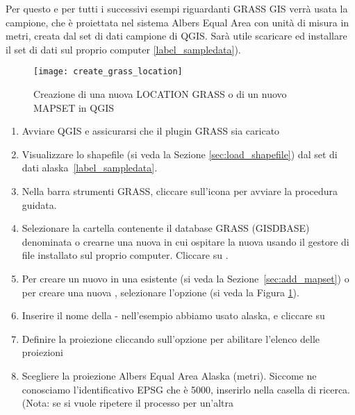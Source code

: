 Per questo e per tutti i successivi esempi riguardanti GRASS GIS verrà usata la  campione, che è proiettata nel sistema Albers Equal Area con unità di
misura in metri, creata dal set di dati campione di QGIS. Sarà utile scaricare
ed installare il set di dati sul proprio computer \ref{label_sampledata}).

\begin{figure}[ht]
\begin{center}
\caption{Creazione di una nuova LOCATION GRASS o di un nuovo MAPSET in QGIS \nixcaption}
\label{fig:create_grass_location}\smallskip
\texttt{[image: create\_grass\_location]}
\end{center}  
\end{figure}

\begin{enumerate}
  \item Avviare QGIS e assicurarsi che il plugin GRASS sia caricato
  \item Visualizzare lo shapefile  (si veda la Sezione
  \ref{sec:load_shapefile}) dal set di dati alaska~\ref{label_sampledata}.
  \item Nella barra strumenti GRASS, cliccare sull'icona
   per avviare la procedura guidata.
  \item Selezionare la cartella contenente il database GRASS (GISDBASE)
  denominata  o crearne una nuova in cui ospitare la nuova
   usando il gestore di file installato sul proprio
  computer. Cliccare su . 
  \item Per creare un nuovo  in una 
  esistente (si veda la Sezione~\ref{sec:add_mapset}) o per creare una nuova
  , selezionare l'opzione  (si veda la Figura \ref{fig:create_grass_location}).
  \item Inserire il nome della  - nell'esempio abbiamo
  usato alaska, e cliccare su  
  \item Definire la proiezione cliccando sull'opzione
   per abilitare l'elenco delle proiezioni 
  \item Scegliere la proiezione Albers Equal Area Alaska (metri). Siccome ne
  conosciamo l'identificativo EPSG che è 5000, inserirlo nella casella di
  ricerca. (Nota: se si vuole ripetere il processo per un'altra

\end{enumerate}
